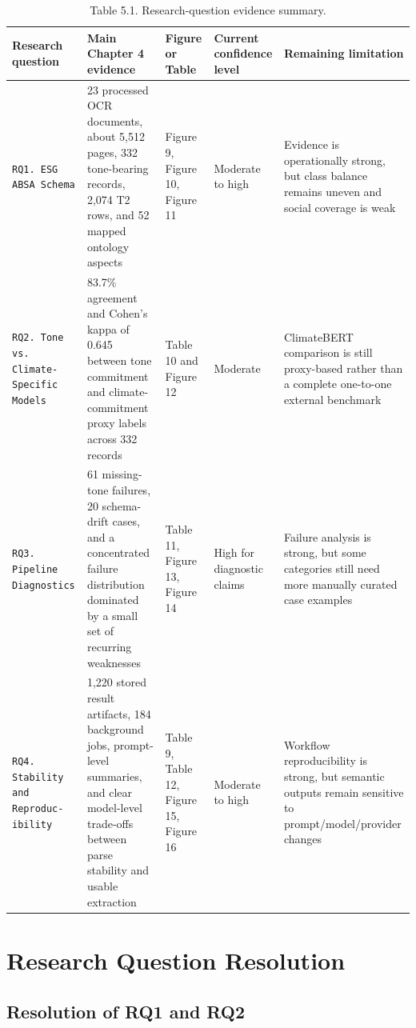 \documentclass[english, online, cse, master]{dithesis}
\begin{document}
\begin{table}[htbp]
\centering
\caption{Table 5.1. Research-question evidence summary.}
\label{tab:research-question-evidence-summary}
\footnotesize
\setlength{\tabcolsep}{4pt}
\renewcommand{\arraystretch}{1.15}
\begin{tabularx}{\linewidth}{|p{2cm}|X|p{2cm}|p{2cm}|X|}
\hline
\textbf{Research question} & \textbf{Main Chapter 4 evidence} & \textbf{Figure or Table} & \textbf{Current confidence level} & \textbf{Remaining limitation} \\ \hline
\texttt{RQ1. ESG ABSA Schema} & 23 processed OCR documents, about 5,512 pages, 332 tone-bearing records, 2,074 T2 rows, and 52 mapped ontology aspects & Figure 9, Figure 10, Figure 11 & Moderate to high & Evidence is operationally strong, but class balance remains uneven and social coverage is weak \\ \hline
\texttt{RQ2. Tone vs. Climate-
Specific Models} & 83.7\% agreement and Cohen's kappa of 0.645 between tone commitment and climate-commitment proxy labels across 332 records & Table 10 and Figure 12 & Moderate & ClimateBERT comparison is still proxy-based rather than a complete one-to-one external benchmark \\ \hline
\texttt{RQ3. Pipeline Diagnostics} & 61 missing-tone failures, 20 schema-drift cases, and a concentrated failure distribution dominated by a small set of recurring weaknesses & Table 11, Figure 13, Figure 14 & High for diagnostic claims & Failure analysis is strong, but some categories still need more manually curated case examples \\ \hline
\texttt{RQ4. Stability and Reproduc-
ibility} & 1,220 stored result artifacts, 184 background jobs, prompt-level summaries, and clear model-level trade-offs between parse stability and usable extraction & Table 9, Table 12, Figure 15, Figure 16 & Moderate to high & Workflow reproducibility is strong, but semantic outputs remain sensitive to prompt/model/provider changes \\ \hline
\end{tabularx}
\end{table}

\section{Research Question Resolution}

\subsection{Resolution of RQ1 and RQ2}
\end{document}
